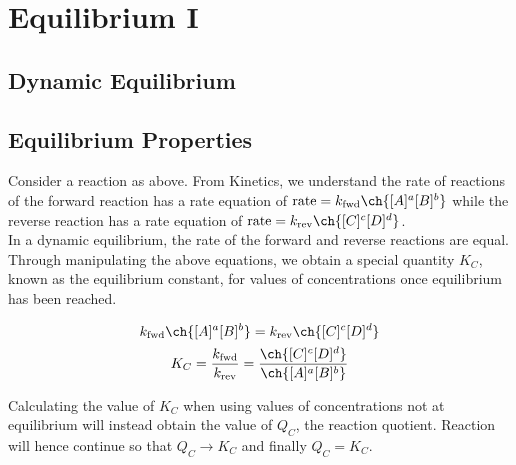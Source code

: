 \documentclass[../main]{subfiles}
\begin{document}
\section{Equilibrium I}

	\subsection{Dynamic Equilibrium}

	\begin{center}  \end{center}



	\subsection{Equilibrium Properties}

	Consider a reaction as above. From Kinetics, we understand the rate of reactions of the forward reaction has a rate equation of \(\text{rate} = k_\text{fwd}\ch{[A]^a[B]^b}\) while the reverse reaction has a rate equation of \(\text{rate} = k_\text{rev}\ch{[C]^c[D]^d}\). \\

	In a dynamic equilibrium, the rate of the forward and reverse reactions are equal. Through manipulating the above equations, we obtain a special quantity \(K_C\), known as the equilibrium constant, for values of concentrations once equilibrium has been reached.

	\begin{equation*} \begin{gathered}
	k_\text{fwd}\ch{[A]^a[B]^b} = k_\text{rev}\ch{[C]^c[D]^d} \\
	K_C = \frac{k_\text{fwd}}{k_\text{rev}} = \frac{\ch{[C]^c[D]^d}}{\ch{[A]^a[B]^b}}
	\end{gathered} \end{equation*}

	Calculating the value of \(K_C\) when using values of concentrations not at equilibrium will instead obtain the value of \(Q_C\), the reaction quotient. Reaction will hence continue so that \(Q_C \rightarrow K_C\) and finally \(Q_C = K_C\). \\
\end{document}
